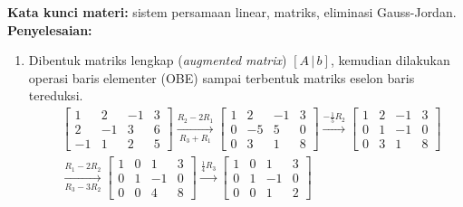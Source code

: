 \documentclass[10pt,openany,a4paper]{article}
\theoremstyle{definition}
\theoremstyle{definition}
\theoremstyle{plain}
\newenvironment{jawab}[2][tes]{%
\par\noindent\textbf{Kata kunci materi:} #1.\\
\textbf{Penyelesaian:} #2%
}{}
\begin{document}
\begin{enumerate}
\begin{jawab}[sistem persamaan linear, matriks, eliminasi Gauss-Jordan]
{\begin{enumerate}
\begin{align*}
{                =
                \underbrace{\begin{bmatrix}
                    3\\ 6\\ 5
                \end{bmatrix}}_{b}}\color{oldcolor}.
            \end{align*}
            \item Dibentuk matriks lengkap (\textit{augmented matrix}) $[A\,|\,b]$, kemudian dilakukan operasi baris elementer (OBE) sampai terbentuk matriks eselon baris tereduksi.
            \begin{align*}
                &\left[\begin{array}{ccc|c}
                    1 & 2 & -1 & 3\\
                    2 & -1 & 3 & 6\\
                    -1 & 1 & 2 & 5
                \end{array}\right]
                \xrightarrow[R_3 + R_1]{R_2 - 2R_1}
                \left[\begin{array}{ccc|c}
                    1 & 2 & -1 & 3\\
                    0 & -5 & 5 & 0\\
                    0 & 3 & 1 & 8
                \end{array}\right]
                \xrightarrow{-\frac{1}{5}R_2}
                \left[\begin{array}{ccc|c}
                    1 & 2 & -1 & 3\\
                    0 & 1 & -1 & 0\\
                    0 & 3 & 1 & 8
                \end{array}\right]\\
                &\xrightarrow[R_3 - 3R_2]{R_1 - 2R_2}
                \left[\begin{array}{ccc|c}
                    1 & 0 & 1 & 3\\
                    0 & 1 & -1 & 0\\
                    0 & 0 & 4 & 8
                \end{array}\right]
                \xrightarrow{\frac{1}{4}R_3}
                \left[\begin{array}{ccc|c}
                    1 & 0 & 1 & 3\\
                    0 & 1 & -1 & 0\\
                    0 & 0 & 1 & 2
                \end{array}\right]

\end{align*}
\end{enumerate}}
\end{jawab}
\end{enumerate}
\end{document}
